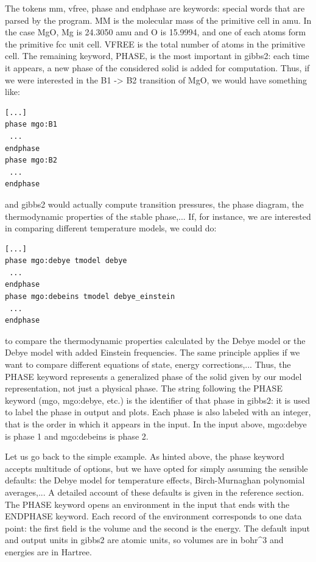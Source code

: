 \documentclass[a4paper]{article}
\begin{document}
The tokens mm, vfree, phase and endphase are keywords: special words
that are parsed by the program. MM is the molecular mass of the
primitive cell in amu. In the case MgO, Mg is 24.3050 amu and O is
15.9994, and one of each atoms form the primitive fcc unit cell. VFREE
is the total number of atoms in the primitive cell. The remaining
keyword, PHASE, is the most important in gibbs2: each time it appears,
a new phase of the considered solid is added for computation. Thus, if
we were interested in the B1 -> B2 transition of MgO, we would have
something like:
%
\gibbslist
\begin{lstlisting}
[...]
phase mgo:B1
 ...
endphase
phase mgo:B2
 ...
endphase
\end{lstlisting}

and gibbs2 would actually compute transition pressures, the phase
diagram, the thermodynamic properties of the stable phase,... If, for
instance, we are interested in comparing different temperature models,
we could do:
%
\gibbslist
\begin{lstlisting}
[...]
phase mgo:debye tmodel debye
 ...
endphase
phase mgo:debeins tmodel debye_einstein
 ...
endphase
\end{lstlisting}

to compare the thermodynamic properties calculated by the Debye model
or the Debye model with added Einstein frequencies. The same principle
applies if we want to compare different equations of state, energy
corrections,... Thus, the PHASE keyword represents a generalized
phase of the solid given by our model representation, not just a
physical phase. The string following the PHASE keyword (mgo,
mgo:debye, etc.) is the identifier of that phase in gibbs2: it is used
to label the phase in output and plots. Each phase is also labeled
with an integer, that is the order in which it appears in the
input. In the input above, mgo:debye is phase 1 and
mgo:debeins is phase 2.

Let us go back to the simple example. As hinted above, the phase
keyword accepts multitude of options, but we have opted for simply
assuming the sensible defaults: the Debye model for temperature
effects, Birch-Murnaghan polynomial averages,... A detailed account of
these defaults is given in the reference section. The PHASE keyword
opens an environment in the input that ends with the ENDPHASE
keyword. Each record of the environment corresponds to one data point:
the first field is the volume and the second is the energy. The
default input and output units in gibbs2 are atomic units, so volumes
are in bohr\textasciicircum{}3 and energies are in Hartree.
\end{document}

